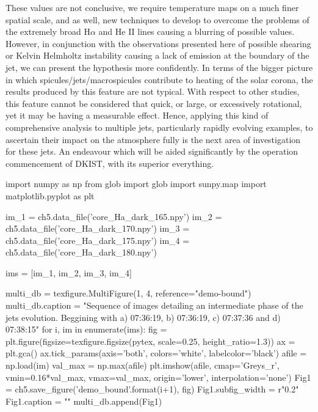 These values are not conclusive, we require temperature maps on a much finer spatial scale, and as well, new techniques to develop to overcome the problems of the extremely broad H$\alpha$ and He II lines causing a blurring of possible values.
However, in conjunction with the observations presented here of possible shearing or Kelvin Helmholtz instability causing a lack of emission at the boundary of the jet, we can present the hypothesis more confidently.
In terms of the bigger picture in which spicules/jets/macrospicules contribute to heating of the solar corona, the results produced by this feature are not typical.
With respect to other studies, this feature cannot be considered that quick, or large, or excessively rotational, yet it may be having a measurable effect.
Hence, applying this kind of comprehensive analysis to multiple jets, particularly rapidly evolving examples, to ascertain their impact on the atmosphere fully is the next area of investigation for these jets.
An endeavour which will be aided significantly by the operation commencement of DKIST, with its superior everything.
 


\begin{pycode}[chapter5]
import numpy as np
from glob import glob
import sunpy.map
import matplotlib.pyplot as plt

im_1 = ch5.data_file('core_Ha_dark_165.npy')
im_2 = ch5.data_file('core_Ha_dark_170.npy')
im_3 = ch5.data_file('core_Ha_dark_175.npy')
im_4 = ch5.data_file('core_Ha_dark_180.npy')

ims = [im_1, im_2, im_3, im_4]

multi_db = texfigure.MultiFigure(1, 4, reference="demo-bound")
multi_db.caption = "Sequence of images detailing an intermediate phase of the jets evolution. Beggining with a) 07:36:19, b) 07:36:19, c) 07:37:36 and d) 07:38:15"
for i, im in enumerate(ims):
	fig = plt.figure(figsize=texfigure.figsize(pytex, scale=0.25, height_ratio=1.3))
	ax = plt.gca()
	ax.tick_params(axis='both', colors='white', labelcolor='black')
	afile = np.load(im)
	val_max = np.max(afile)
	plt.imshow(afile, cmap='Greys_r', vmin=0.16*val_max, vmax=val_max, origin='lower', interpolation='none')
	Fig1 = ch5.save_figure('demo_bound{}'.format(i+1), fig)
	Fig1.subfig_width = r"0.2\textwidth"
	Fig1.caption = ""
	multi_db.append(Fig1)

\end{pycode}

